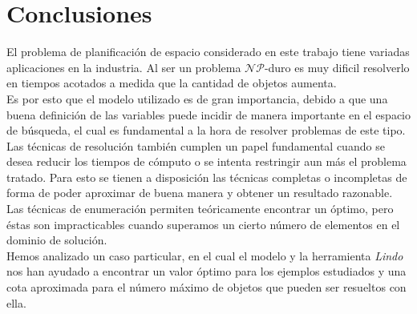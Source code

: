 \section{Conclusiones\label{sec:conclusiones}}
El problema de planificación de espacio considerado en este trabajo
tiene variadas aplicaciones en la industria. Al ser un problema
$\mathcal{NP}$-duro es muy dificil resolverlo en tiempos acotados a
medida que la cantidad de objetos aumenta. \\

Es por esto que el modelo utilizado es de gran importancia, debido
a que una buena definición de las variables puede incidir de manera
importante en el espacio de búsqueda, el cual es fundamental a la
hora de resolver problemas de este tipo. \\

Las técnicas de resolución también cumplen un papel fundamental cuando
se desea reducir los tiempos de cómputo o se intenta restringir aun más
el problema tratado. Para esto se tienen a disposición las técnicas
completas o incompletas de forma de poder aproximar de buena manera y
obtener un resultado razonable. \\

Las técnicas de enumeración permiten teóricamente
encontrar un óptimo, pero éstas son impracticables cuando superamos un
cierto número de elementos en el dominio de solución. \\

Hemos analizado un caso particular, en el cual el modelo y la herramienta
\textit{Lindo} nos han ayudado a encontrar un valor óptimo para los ejemplos
estudiados y una cota aproximada para el número máximo de objetos que pueden
ser resueltos con ella.
